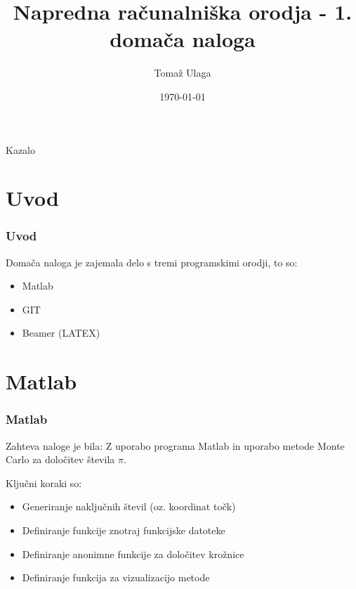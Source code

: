 \documentclass[svgnames]{beamer}
\title[NROR]{Napredna računalniška orodja - 1. domača naloga}
\author[T. Ulaga]{Tomaž Ulaga}
\institute[FS UL]{Univerza v Ljubljani, Fakulteta za strojništvo}
\date{\today}
\begin{document}
\frame{\titlepage}

\begin{frame}{Kazalo}
    \tableofcontents
\end{frame}



\section{Uvod}

\begin{frame}
\frametitle{Uvod}
Domača naloga je zajemala delo s tremi programskimi orodji, to so:
    \begin{itemize}
        \item  Matlab
        \item  GIT
        \item  Beamer (LATEX)
    \end{itemize}
\end{frame}


\section{Matlab}

\begin{frame}
\frametitle{Matlab}

Zahteva naloge je bila: Z uporabo programa Matlab in uporabo metode Monte Carlo za določitev števila \(\pi\).

Ključni koraki so:

    
    \begin{itemize}
        \item Generiranje naključnih števil (oz. koordinat točk)
        \item Definiranje funkcije znotraj funkcijske datoteke
        \item Definiranje anonimne funkcije za določitev krožnice 
        \item Definiranje funkcija za vizualizacijo metode
    \end{itemize}
\end{frame}
\end{document}
